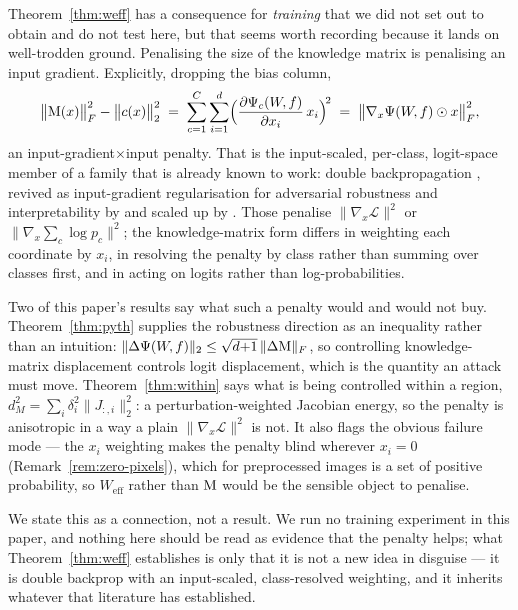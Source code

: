 \begin{remark}
\label{rem:doublebackprop}
Theorem~\ref{thm:weff} has a consequence for \emph{training} that we did not set
out to obtain and do not test here, but that seems worth recording because it
lands on well-trodden ground. Penalising the size of the knowledge matrix is
penalising an input gradient. Explicitly, dropping the bias column,
\[
\bigl\|\mathrm{M}(x)\bigr\|_F^2-\bigl\|c(x)\bigr\|_2^2
\;=\;\sum_{c=1}^{C}\sum_{i=1}^{d}
\Bigl(\frac{\partial \Psi_c(W\!,f)}{\partial x_i}\,x_i\Bigr)^{\!2}
\;=\;\bigl\|\nabla_x\Psi(W\!,f)\odot x\bigr\|_F^2 ,
\]
an input-gradient$\times$input penalty. That is the input-scaled, per-class,
logit-space member of a family that is already known to work: double
backpropagation \citep{drucker1992improving}, revived as input-gradient
regularisation for adversarial robustness and interpretability by
\citet{ross2018improving} and scaled up by \citet{finlay2019scaleable}. Those
penalise $\|\nabla_x\mathcal L\|^2$ or $\|\nabla_x\sum_c\log p_c\|^2$; the
knowledge-matrix form differs in weighting each coordinate by $x_i$, in
resolving the penalty by class rather than summing over classes first, and in
acting on logits rather than log-probabilities.

Two of this paper's results say what such a penalty would and would not buy.
Theorem~\ref{thm:pyth} supplies the robustness direction as an inequality rather
than an intuition: $\|\Delta\Psi(W\!,f)\|_2\le\sqrt{d{+}1}\,\|\Delta\mathrm{M}\|_F$, so
controlling knowledge-matrix displacement controls logit displacement, which is
the quantity an attack must move. Theorem~\ref{thm:within} says what is being
controlled within a region, $d_M^2=\sum_i\delta_i^2\|J_{:,i}\|_2^2$: a
perturbation-weighted Jacobian energy, so the penalty is anisotropic in a way a
plain $\|\nabla_x\mathcal L\|^2$ is not. It also flags the obvious failure mode
--- the $x_i$ weighting makes the penalty blind wherever $x_i=0$
(Remark~\ref{rem:zero-pixels}), which for preprocessed images is a set of
positive probability, so $W_{\mathrm{eff}}$ rather than $\mathrm{M}$ would be the
sensible object to penalise.

We state this as a connection, not a result. We run no training experiment in
this paper, and nothing here should be read as evidence that the penalty helps;
what Theorem~\ref{thm:weff} establishes is only that it is not a new idea in
disguise --- it is double backprop with an input-scaled, class-resolved
weighting, and it inherits whatever that literature has established.
\end{remark}

